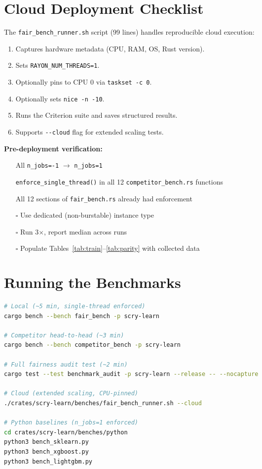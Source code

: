 \documentclass[11pt,a4paper]{article}
\begin{document}
\section{Cloud Deployment Checklist}

The \texttt{fair\_bench\_runner.sh} script (99 lines) handles
reproducible cloud execution:

\begin{enumerate}[nosep]
    \item Captures hardware metadata (CPU, RAM, OS, Rust version).
    \item Sets \texttt{RAYON\_NUM\_THREADS=1}.
    \item Optionally pins to CPU 0 via \texttt{taskset -c 0}.
    \item Optionally sets \texttt{nice -n -10}.
    \item Runs the Criterion suite and saves structured results.
    \item Supports \texttt{-{}-cloud} flag for extended scaling tests.
\end{enumerate}

\textbf{Pre-deployment verification:}
\begin{itemize}[nosep]
    \item[\checkmark] All \texttt{n\_jobs=-1} $\to$ \texttt{n\_jobs=1}
    \item[\checkmark] \texttt{enforce\_single\_thread()} in all 12
          \texttt{competitor\_bench.rs} functions
    \item[\checkmark] All 12 sections of \texttt{fair\_bench.rs}
          already had enforcement
    \item[$\square$] Use dedicated (non-burstable) instance type
    \item[$\square$] Run 3$\times$, report median across runs
    \item[$\square$] Populate Tables~\ref{tab:train}--\ref{tab:parity}
          with collected data
\end{itemize}

\section{Running the Benchmarks}

\begin{lstlisting}[language=bash]
# Local (~5 min, single-thread enforced)
cargo bench --bench fair_bench -p scry-learn

# Competitor head-to-head (~3 min)
cargo bench --bench competitor_bench -p scry-learn

# Full fairness audit test (~2 min)
cargo test --test benchmark_audit -p scry-learn --release -- --nocapture

# Cloud (extended scaling, CPU-pinned)
./crates/scry-learn/benches/fair_bench_runner.sh --cloud

# Python baselines (n_jobs=1 enforced)
cd crates/scry-learn/benches/python
python3 bench_sklearn.py
python3 bench_xgboost.py
python3 bench_lightgbm.py
\end{lstlisting}
\end{document}
